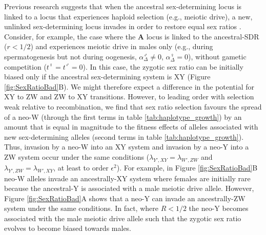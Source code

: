 \documentclass[12pt]{article}
\begin{document}
Previous research suggests that when the ancestral sex-determining locus is linked to a locus that experiences haploid selection (e.g., meiotic drive), a new, unlinked sex-determining locus invades in order to restore equal sex ratios \citep{Kozielska:2010vm}. 
Consider, for example, the case where the \textbf{A} locus is linked to the ancestral-SDR ($r<1/2$) and experiences meiotic drive in males only (e.g., during spermatogenesis but not during oogenesis, $\alpha^\male_\Delta \neq 0$, $\alpha^\female_\Delta=0$), without gametic competition ($t^\female=t^\male=0$).
In this case, the zygotic sex ratio can be initially biased only if the ancestral sex-determining system is XY (Figure \ref{fig:SexRatioBad}B). 
We might therefore expect a difference in the potential for XY to ZW and ZW to XY transitions. 
However, to leading order with selection weak relative to recombination, we find that sex ratio selection favours the spread of a neo-W (through the first terms in table \ref{tab:haplotype_growth}) by an amount that is equal in magnitude to the fitness effects of alleles associated with new sex-determining alleles (second terms in table \ref{tab:haplotype_growth}).
Thus, invasion by a neo-W into an XY system and invasion by a neo-Y into a ZW system occur under the same conditions ($\lambda_{Y',XY}=\lambda_{W',ZW}$ and $\lambda_{Y',ZW}=\lambda_{W',XY}$, at least to order $\epsilon^2$).
For example, in Figure \ref{fig:SexRatioBad}B neo-W alleles invade an ancestrally-XY system where females are initially rare because the ancestral-Y is associated with a male meiotic drive allele.
However, Figure \ref{fig:SexRatioBad}A shows that a neo-Y can invade an ancestrally-ZW system under the same conditions. 
In fact, where $R<1/2$ the neo-Y becomes associated with the male meiotic drive allele such that the zygotic sex ratio evolves to become biased towards males.

\end{document}
